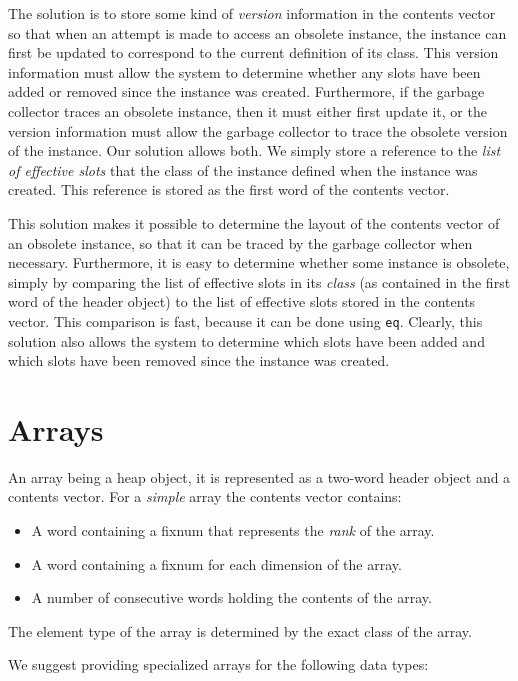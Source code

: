 The solution is to store some kind of \emph{version} information in
the contents vector so that when an attempt is made to access an
obsolete instance, the instance can first be updated to correspond to
the current definition of its class.  This version information must
allow the system to determine whether any slots have been added or
removed since the instance was created.  Furthermore, if the garbage
collector traces an obsolete instance, then it must either first
update it, or the version information must allow the garbage collector
to trace the obsolete version of the instance.  Our solution allows
both.  We simply store a reference to the \emph{list of effective
  slots} that the class of the instance defined when the instance was
created.  This reference is stored as the first word of the contents
vector.  

This solution makes it possible to determine the layout of the
contents vector of an obsolete instance, so that it can be traced by
the garbage collector when necessary.  Furthermore, it is easy to
determine whether some instance is obsolete, simply by comparing the
list of effective slots in its \emph{class} (as contained in the first
word of the header object) to the list of effective slots stored in
the contents vector.  This comparison is fast, because it can be done
using \texttt{eq}.  Clearly, this solution also allows the system to
determine which slots have been added and which slots have been
removed since the instance was created. 

\section{Arrays}

An array being a heap object, it is represented as a two-word header
object and a contents vector.  For a \emph{simple} array the contents
vector contains:

\begin{itemize}
\item A word containing a fixnum that represents the \emph{rank} of
  the array.
\item A word containing a fixnum for each dimension of the array.
\item A number of consecutive words holding the contents of the
  array. 
\end{itemize}

The element type of the array is determined by the exact class of the
array. 

We suggest providing specialized arrays for the following data types:


